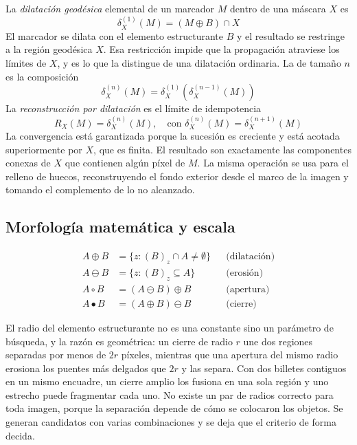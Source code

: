 \documentclass[conference]{IEEEtran}
\begin{document}
La \emph{dilatación geodésica} elemental de un marcador $M$ dentro de
una máscara $X$ es
\begin{equation}
\delta^{(1)}_X(M) = (M \oplus B) \cap X
\end{equation}
El marcador se dilata con el elemento estructurante $B$ y el resultado
se restringe a la región geodésica $X$. Esa restricción impide que la
propagación atraviese los límites de $X$, y es lo que la distingue de
una dilatación ordinaria. La de tamaño $n$ es la composición
\begin{equation}
\delta^{(n)}_X(M) = \delta^{(1)}_X\!\left(\delta^{(n-1)}_X(M)\right)
\end{equation}
La \emph{reconstrucción por dilatación} es el límite de idempotencia
\begin{equation}
R_X(M) = \delta^{(n)}_X(M), \quad
\text{con } \delta^{(n)}_X(M) = \delta^{(n+1)}_X(M)
\end{equation}
La convergencia está garantizada porque la sucesión es creciente y está
acotada superiormente por $X$, que es finita. El resultado son
exactamente las componentes conexas de $X$ que contienen algún píxel de
$M$. La misma operación se usa para el relleno de huecos, reconstruyendo
el fondo exterior desde el marco de la imagen y tomando el complemento
de lo no alcanzado.

\subsection{Morfología matemática y escala}

\begin{align}
A \oplus B &= \{z : (B)_z \cap A \neq \emptyset\} && \text{(dilatación)}\\
A \ominus B &= \{z : (B)_z \subseteq A\} && \text{(erosión)}\\
A \circ B &= (A \ominus B)\oplus B && \text{(apertura)}\\
A \bullet B &= (A \oplus B)\ominus B && \text{(cierre)}
\end{align}

El radio del elemento estructurante no es una constante sino un
parámetro de búsqueda, y la razón es geométrica: un cierre de radio $r$
une dos regiones separadas por menos de $2r$ píxeles, mientras que una
apertura del mismo radio erosiona los puentes más delgados que $2r$ y
las separa. Con dos billetes contiguos en un mismo encuadre, un cierre
amplio los fusiona en una sola región y uno estrecho puede fragmentar
cada uno. No existe un par de radios correcto para toda imagen, porque
la separación depende de cómo se colocaron los objetos. Se generan
candidatos con varias combinaciones y se deja que el criterio de forma
decida.
\end{document}
